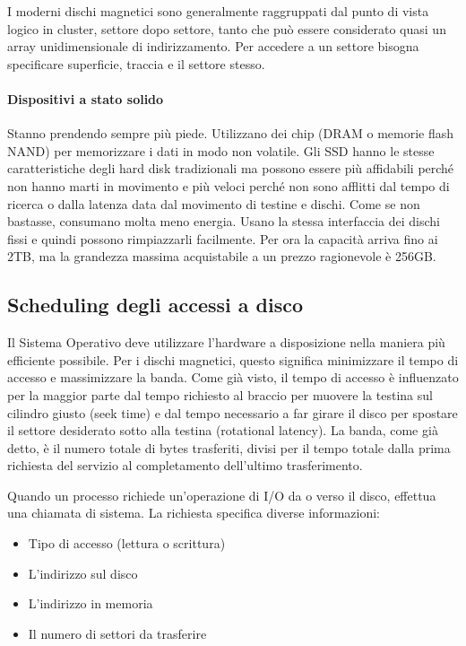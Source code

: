 \documentclass[a4paper]{article}
\begin{document}
I moderni dischi magnetici sono generalmente raggruppati dal punto di vista logico in cluster, settore dopo settore, tanto che può essere considerato quasi un array unidimensionale di indirizzamento. Per accedere a un settore bisogna specificare superficie, traccia e il settore stesso.

\paragraph{Dispositivi a stato solido}
Stanno prendendo sempre più piede. Utilizzano dei chip (DRAM o memorie flash NAND) per memorizzare i dati in modo non volatile. Gli SSD hanno le stesse caratteristiche degli hard disk tradizionali ma possono essere più affidabili perché non hanno marti in movimento e più veloci perché non sono afflitti dal tempo di ricerca o dalla latenza data dal movimento di testine e dischi. Come se non bastasse, consumano molta meno energia. Usano la stessa interfaccia dei dischi fissi e quindi possono rimpiazzarli facilmente. Per ora la capacità arriva fino ai 2TB, ma la grandezza massima acquistabile a un prezzo ragionevole è 256GB.

\subsection{Scheduling degli accessi a disco}
Il Sistema Operativo deve utilizzare l'hardware a disposizione nella maniera più efficiente possibile. Per i dischi magnetici, questo significa minimizzare il tempo di accesso e massimizzare la banda. Come già visto, il tempo di accesso è influenzato per la maggior parte dal tempo richiesto al braccio per muovere la testina sul cilindro giusto (seek time) e dal tempo necessario a far girare il disco per spostare il settore desiderato sotto alla testina (rotational latency). La banda, come già detto, è il numero totale di bytes trasferiti, divisi per il tempo totale dalla prima richiesta del servizio al completamento dell'ultimo trasferimento.

Quando un processo richiede un'operazione di I/O da o verso il disco, effettua una chiamata di sistema. La richiesta specifica diverse informazioni:
\begin{itemize}
    \item Tipo di accesso (lettura o scrittura)
    \item L'indirizzo sul disco
    \item L'indirizzo in memoria
    \item Il numero di settori da trasferire
\end{itemize}
\end{document}
